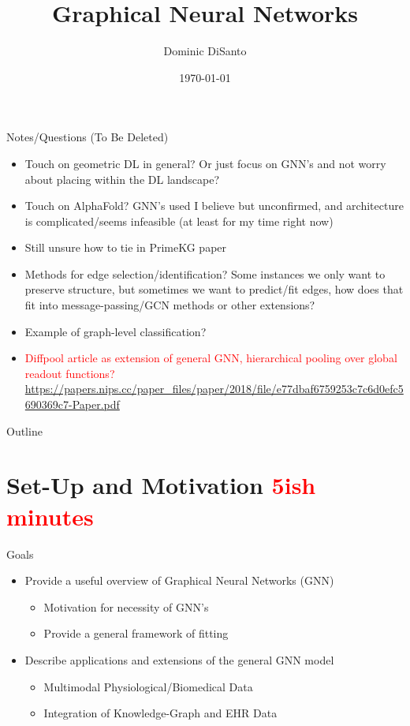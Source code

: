 \documentclass{beamer}
\title{Graphical Neural Networks}
\author{Dominic DiSanto}
\institute[]{Department of Biostatistics, Harvard University}
\date{\today}
\begin{document}
\begin{frame}[allowframebreaks]{Notes/Questions (To Be Deleted)}
    \begin{itemize}
        \item Touch on geometric DL in general? Or just focus on GNN's and not worry about placing within the DL landscape? 
        \item Touch on AlphaFold? GNN's used I believe but unconfirmed, and architecture is complicated/seems infeasible (at least for my time right now)
        \item Still unsure how to tie in PrimeKG paper
        \item Methods for edge selection/identification? Some instances we only want to preserve structure, but sometimes we want to predict/fit edges, how does that fit into message-passing/GCN methods or other extensions? 
        \item Example of graph-level classification?  
        \item \textcolor{red}{Diffpool article as extension of general GNN, hierarchical pooling over global readout functions?} \url{https://papers.nips.cc/paper_files/paper/2018/file/e77dbaf6759253c7c6d0efc5690369c7-Paper.pdf}
    \end{itemize}
\end{frame}


\begin{frame}
\maketitle
\end{frame}

\begin{frame}{Outline}
\tableofcontents 
\end{frame}


\section{Set-Up and Motivation \textcolor{red}{5ish minutes}}

\begin{frame}{Goals}
    \begin{itemize}\setlength\itemsep{8mm}
        \item Provide a useful overview of Graphical Neural Networks (GNN)
        \begin{itemize}
            \item Motivation for necessity of GNN's 
            \item Provide a general framework of fitting 
        \end{itemize}
        \item Describe applications and extensions of the general GNN model 
        \begin{itemize}
            \item Multimodal Physiological/Biomedical Data
            \item Integration of Knowledge-Graph and EHR Data
        \end{itemize}
    \end{itemize}
\end{frame}
\end{document}
